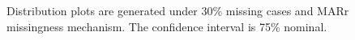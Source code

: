 \documentclass[12pt, fullpage, a4paper]{article}
\begin{document}
\begin{figure}[ht!]
	\begin{center}
	\end{center}
	\caption{Distribution plots are generated under 30\% missing cases and MARr missingness mechanism. The confidence interval is 75\% nominal.}
	\label{fig4}
\end{figure}
\end{document}
